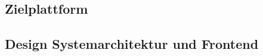 \subsection{Zielplattform}\label{subsec:Zielplattform}

\subsection{Design Systemarchitektur und Frontend}\label{subsec:DesignSystemarchitekturUndFrontend}